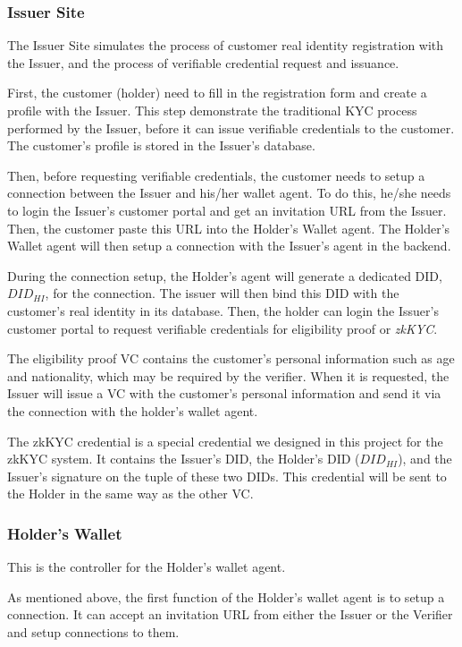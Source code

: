 \documentclass[
]{report}
\begin{document}
\subsubsection{Issuer Site}
The Issuer Site simulates the process of customer real identity registration
with the Issuer, and the process of verifiable credential request and 
issuance. 

First, the customer (holder) need to fill in the registration form and create a
profile with the Issuer. This step demonstrate the traditional KYC process
performed by the Issuer, before it can issue verifiable credentials to the
customer. The customer's profile is stored in the Issuer's database.

Then, before requesting verifiable credentials, the customer needs to setup a 
connection between the Issuer and his/her wallet agent. To do this, he/she
needs to login the Issuer's customer portal and get an invitation URL from
the Issuer. Then, the customer paste this URL into the Holder's Wallet agent.
The Holder's Wallet agent will then setup a connection with the Issuer's
agent in the backend.

During the connection setup, the Holder's agent will generate a dedicated DID,
\texttt{$DID_{HI}$}, for the connection. The issuer will then bind this DID
with the customer's real identity in its database.
Then, the holder can login the Issuer's customer portal to request verifiable
credentials for eligibility proof or \emph{zkKYC}.

The eligibility proof VC contains the customer's personal information such as
age and nationality, which may be required by the verifier. When it is
requested, the Issuer will issue a VC with the customer's personal information
and send it via the connection with the holder's wallet agent.

The zkKYC credential is a special credential we designed in this project for
the zkKYC system. It contains the Issuer's DID, the Holder's DID 
(\texttt{$DID_{HI}$}), and the Issuer's signature on the tuple of these two
DIDs. This credential will be sent to the Holder in the same way as the other
VC.

\subsubsection{Holder's Wallet}
This is the controller for the Holder's wallet agent.

As mentioned above, the first function of the Holder's wallet agent is to
setup a connection. It can accept an invitation URL from either the Issuer
or the Verifier and setup connections to them.
\end{document}
